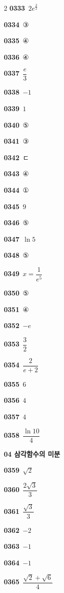 \documentclass[10pt,a4paper]{article}
\begin{document}
\begin{multicols}{2}
\noindent\textbf{0333}\ $2e^{\frac{3}{2}}$\par
\noindent\textbf{0334}\ ③\par
\noindent\textbf{0335}\ ④\par
\noindent\textbf{0336}\ ④\par
\noindent\textbf{0337}\ $\dfrac{e}{3}$\par
\noindent\textbf{0338}\ $-1$\par
\noindent\textbf{0339}\ $1$\par
\noindent\textbf{0340}\ ⑤\par
\noindent\textbf{0341}\ ③\par
\noindent\textbf{0342}\ ㄷ\par
\noindent\textbf{0343}\ ④\par
\noindent\textbf{0344}\ ①\par
\noindent\textbf{0345}\ $9$\par
\noindent\textbf{0346}\ ⑤\par
\noindent\textbf{0347}\ $\ln 5$\par
\noindent\textbf{0348}\ ⑤\par
\noindent\textbf{0349}\ $x=\dfrac{1}{e^5}$\par
\noindent\textbf{0350}\ ⑤\par
\noindent\textbf{0351}\ ④\par
\noindent\textbf{0352}\ $-e$\par
\noindent\textbf{0353}\ $\dfrac{3}{2}$\par
\noindent\textbf{0354}\ $\dfrac{2}{e+2}$\par
\noindent\textbf{0355}\ $6$\par
\noindent\textbf{0356}\ $4$\par
\noindent\textbf{0357}\ $4$\par
\noindent\textbf{0358}\ $\dfrac{\ln 10}{4}$\par
\noindent\textbf{04 삼각함수의 미분}\par\smallskip
\noindent\textbf{0359}\ $\sqrt{2}$\par
\noindent\textbf{0360}\ $\dfrac{2\sqrt{3}}{3}$\par
\noindent\textbf{0361}\ $\dfrac{\sqrt{3}}{3}$\par
\noindent\textbf{0362}\ $-2$\par
\noindent\textbf{0363}\ $-1$\par
\noindent\textbf{0364}\ $-1$\par
\noindent\textbf{0365}\ $\dfrac{\sqrt{2}+\sqrt{6}}{4}$\par

\end{multicols}
\end{document}
